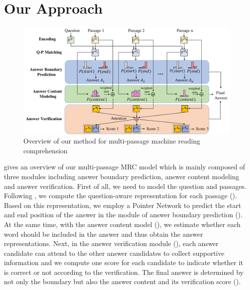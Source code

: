\section{Our Approach}
\label{approach}


\begin{figure}[ht]
\centering
\includegraphics[width=\textwidth]{architecture.pdf}

\caption{Overview of our method for multi-passage machine reading comprehension}
\label{fig:architecture}
\end{figure}

 gives an overview of our multi-passage MRC model
which is mainly composed of three modules including answer boundary prediction, answer content modeling and answer verification.
First of all, we need to model the question and passages. Following , we compute the question-aware representation for each passage ().
Based on this representation, we employ a Pointer Network \cite{pointer-net} to predict the start and end position of the answer in the module of answer boundary prediction (). 
At the same time, with the answer content model (), we estimate whether each word should be included in the answer and thus obtain the answer representations. 
Next, in the answer verification module (), each answer candidate can attend to the other answer candidates to collect supportive information and we compute one score for each candidate to indicate whether it is correct or not according to the verification. 
The final answer is determined by not only the boundary but also the answer content and its verification score ().

